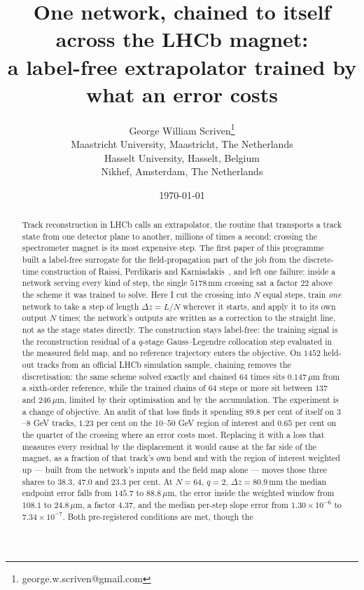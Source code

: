 \documentclass[11pt,a4paper]{article}
\title{One network, chained to itself across the LHCb magnet:\\
a label-free extrapolator trained by what an error costs}
\author{George William Scriven\thanks{george.w.scriven@gmail.com}\\[2pt]
\normalsize Maastricht University, Maastricht, The Netherlands\\
\normalsize Hasselt University, Hasselt, Belgium\\
\normalsize Nikhef, Amsterdam, The Netherlands}
\date{\today}
\newcommand{\um}{\ensuremath{\,\mu\mathrm{m}}}
\newcommand{\mm}{\ensuremath{\,\mathrm{mm}}}
\begin{document}
\maketitle

\begin{abstract}
Track reconstruction in LHCb calls an extrapolator, the routine that transports
a track state from one detector plane to another, millions of
times a second; crossing the spectrometer magnet is its most expensive step.
The first paper of this programme~\citep{scriven2026lhcb1} built a label-free
surrogate for the field-propagation part of the job from the
discrete-time construction of Raissi, Perdikaris and
Karniadakis~\citep{raissi2019}, and left one failure: inside a network serving
every kind of step, the single $5178\mm$ crossing sat a factor $22$ above the
scheme it was trained to solve. Here I cut the crossing into $N$ equal steps,
train \emph{one} network to take a step of length $\Delta z = L/N$ wherever it
starts, and apply it to its own output $N$ times; the network's outputs are
written as a correction to the straight line, not as the stage states directly.
The construction stays label-free: the training signal is the reconstruction
residual of a $q$-stage Gauss--Legendre collocation step evaluated in the
measured field map, and no reference trajectory enters the objective. On
$1452$ held-out tracks from an official LHCb simulation sample, chaining
removes the discretisation: the same scheme solved exactly and chained $64$
times sits $0.147\um$ from a sixth-order reference, while the trained chains of
$64$ steps or more sit between $137$ and $246\um$, limited by their
optimisation and by the accumulation. The experiment is a change of objective. An audit of that loss
finds it spending $89.8$ per cent
of itself on $3$--$8$ GeV tracks, $1.23$ per cent on the $10$--$50$ GeV region
of interest and $0.65$ per cent on the quarter of the crossing where an error
costs most. Replacing it with a loss that measures every residual
by the displacement it would cause at the far side of the magnet, as a fraction
of that track's own bend and with the region of interest weighted up --- built
from the network's inputs and the field map alone --- moves those three shares
to $38.3$, $47.0$ and $23.3$ per cent. At $N = 64$, $q = 2$,
$\Delta z = 80.9\mm$ the median endpoint error falls from $145.7$ to $88.8\um$,
the error inside the weighted window from $108.1$ to $24.8\um$, a factor
$4.37$, and the median per-step slope error from $1.30\times10^{-6}$ to
$7.34\times10^{-7}$. Both pre-registered conditions are met, though the

\end{abstract}
\end{document}
